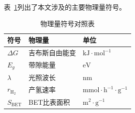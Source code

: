 表~\ref{tab:symbols}列出了本文涉及的主要物理量符号。

\begin{table}[htbp]
\centering
\caption{物理量符号对照表}
\label{tab:symbols}
\begin{tabular}{lll}
\toprule
符号 & 物理量 & 单位 \\
\midrule
$\Delta G$ & 吉布斯自由能变 & $\mathrm{kJ \cdot mol^{-1}}$ \\
$E_g$ & 带隙能量 & $\mathrm{eV}$ \\
$\lambda$ & 光照波长 & $\mathrm{nm}$ \\
$r_{\mathrm{H_2}}$ & 产氢速率 & $\mathrm{mmol \cdot h^{-1} \cdot g^{-1}}$ \\
$S_{\mathrm{BET}}$ & BET比表面积 & $\mathrm{m^2 \cdot g^{-1}}$ \\
\bottomrule
\end{tabular}
\end{table}
